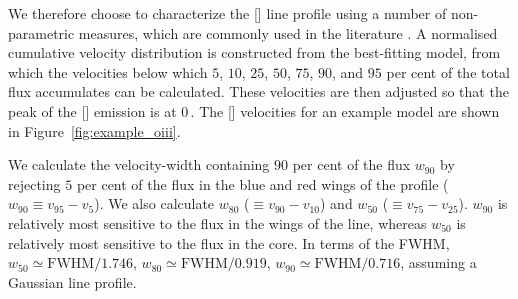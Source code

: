 We therefore choose to characterize the [] line profile using a number of non-parametric measures, which are commonly used in the literature \citep[e.g.][]{whittle85,zakamska14,zakamska16}. 
A normalised cumulative velocity distribution is constructed from the best-fitting model, from which the velocities below which $5$, $10$, $25$, $50$, $75$, $90$, and $95$ per cent of the total flux accumulates can be calculated. 
These velocities are then adjusted so that the peak of the [] emission is at $0$\,\kms. 
The [] velocities for an example model are shown in Figure~\ref{fig:example_oiii}.

We calculate the velocity-width containing $90$ per cent of the flux $w_{90}$ by rejecting $5$ per cent of the flux in the blue and red wings of the profile ($w_{90}\equiv v_{95} - v_{5}$).
We also calculate $w_{80}$ ($\equiv v_{90} - v_{10}$) and $w_{50}$ ($\equiv v_{75} - v_{25}$).
$w_{90}$ is relatively most sensitive to the flux in the wings of the line, whereas $w_{50}$ is relatively most sensitive to the flux in the core.  
In terms of the FWHM, $w_{50} \simeq \text{FWHM} / 1.746$, $w_{80} \simeq \text{FWHM} / 0.919$, $w_{90} \simeq \text{FWHM} / 0.716$, assuming a Gaussian line profile.  


